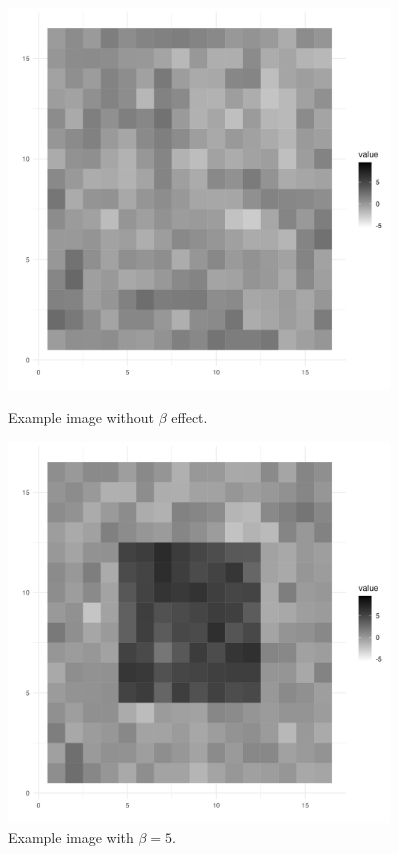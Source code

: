 \documentclass[12pt]{article}
\begin{document}
\begin{figure}[H]
    \centering
    \begin{minipage}[b]{0.45\textwidth}
        \centering
        \includegraphics[width=0.9\textwidth]{../Figures/ex_image_5c.png}
        \caption{Example image without \(\beta\) effect.}
        \label{fig:image1}
    \end{minipage}\hfill
    \begin{minipage}[b]{0.45\textwidth}
        \centering
        \includegraphics[width=0.9\textwidth]{../Figures/ex_image_5.png}
        \caption{Example image with \(\beta = 5\).}
        \label{fig:image2}
    \end{minipage}


\end{figure}
\end{document}
